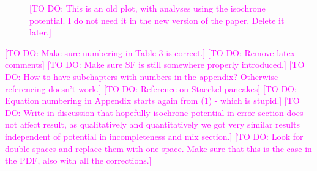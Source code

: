 \documentclass[iop,revtex4]{emulateapj}
\newcommand{\Wilma}[1]{\textcolor{Magenta}{#1}}
\newcommand{\OLD}[1]{}
\begin{document}
\begin{appendix}
\begin{figure}[!htbp]
\begin{minipage}{0.48\textwidth}
\caption{\Wilma{[TO DO: This is an old plot, with analyses using the isochrone potential. I do not need it in the new version of the paper. Delete it later.]} \OLD{Same as Figure \ref{fig:MWdhbIncompR_violins}, but without including information about the tangential velocities in the analysis. This was done by marginalizing the likelihood in Equation \eqref{eq:prob} over $v_T$ (bright grey violins; the dark grey violins are the same as in Figure \ref{fig:MWdhbIncompR_violins} for comparison). The parameter recovery is much worse than in Figure \ref{fig:MWdhbIncompR_violins}. This could indicate that much of the information about the potential is actually stored in the rotation curve, i.e., $v_T(R)$, which is not affected by removing stars from the data set. But even if we do not include $v_T$ we can still recover the potential within the errors, at least for small ($\epsilon_r \lesssim 0.15$).}} 
\label{fig:isoSphFlexIncompR_marginal_violins}
\end{minipage}
\end{figure}

\end{appendix}

\Wilma{[TO DO: Make sure numbering in Table 3 is correct.]}
\Wilma{[TO DO: Remove latex comments]}
\Wilma{[TO DO: Make sure SF is still somewhere properly introduced.]}
\Wilma{[TO DO: How to have subchapters with numbers in the appendix? Otherwise referencing doesn't work.]}
\Wilma{[TO DO: Reference on Staeckel pancakes]}
\Wilma{[TO DO: Equation numbering in Appendix starts again from (1) - which is stupid.]}
\Wilma{[TO DO: Write in discussion that hopefully isochrone potential in error section does not affect result, as qualitatively and quantitatively we got very similar results independent of potential in incompleteness and mix section.]}
\Wilma{[TO DO: Look for double spaces and replace them with one space. Make sure that this is the case in the PDF, also with all the corrections.]}
\end{document}
